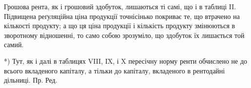 Грошова рента, як і грошовий здобуток, лишаються ті самі, що і в таблиці II.
Підвищена реґуляційна ціна продукції точнісінько покриває те, що втрачено
на кількості продукту; а що ця ціна продукції і кількість продукту змінюються
в зворотному відношенні, то само собою зрозуміло, що здобуток їх лишається
той самий.

*) Тут, як і далі в таблицях VIII, IX, і X пересічну норму ренти обчислено не до всього
вкладеного капіталу, а тільки до капіталу, вкладеного в рентодайні дільниці. Пр. Ред.

